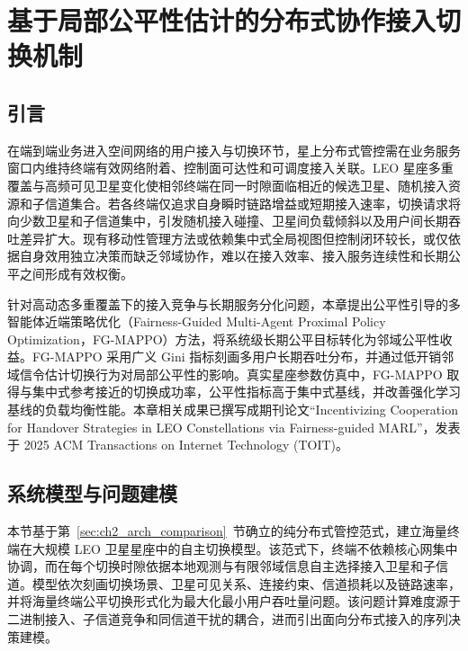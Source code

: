 \chapter{基于局部公平性估计的分布式协作接入切换机制}
\label{chap:handover}

\section{引言}

在端到端业务进入空间网络的用户接入与切换环节，星上分布式管控需在业务服务窗口内维持终端有效网络附着、控制面可达性和可调度接入关联。LEO 星座多重覆盖与高频可见卫星变化使相邻终端在同一时隙面临相近的候选卫星、随机接入资源和子信道集合。若各终端仅追求自身瞬时链路增益或短期接入速率，切换请求将向少数卫星和子信道集中，引发随机接入碰撞、卫星间负载倾斜以及用户间长期吞吐差异扩大。现有移动性管理方法或依赖集中式全局视图但控制闭环较长，或仅依据自身效用独立决策而缺乏邻域协作，难以在接入效率、接入服务连续性和长期公平之间形成有效权衡。

针对高动态多重覆盖下的接入竞争与长期服务分化问题，本章提出公平性引导的多智能体近端策略优化（Fairness-Guided Multi-Agent Proximal Policy Optimization，FG-MAPPO）方法，将系统级长期公平目标转化为邻域公平性收益。FG-MAPPO 采用广义 Gini 指标刻画多用户长期吞吐分布，并通过低开销邻域信令估计切换行为对局部公平性的影响。真实星座参数仿真中，FG-MAPPO 取得与集中式参考接近的切换成功率，公平性指标高于集中式基线，并改善强化学习基线的负载均衡性能。本章相关成果已撰写成期刊论文``Incentivizing Cooperation for Handover Strategies in LEO Constellations via Fairness-guided MARL''\cite{lxp-incentivizing}，发表于 2025 ACM Transactions on Internet Technology (TOIT)。

\section{系统模型与问题建模}
\label{sec:ch3_sysmodel}

本节基于第~\ref{sec:ch2_arch_comparison}~节确立的纯分布式管控范式，建立海量终端在大规模 LEO 卫星星座中的自主切换模型。该范式下，终端不依赖核心网集中协调，而在每个切换时隙依据本地观测与有限邻域信息自主选择接入卫星和子信道。模型依次刻画切换场景、卫星可见关系、连接约束、信道损耗以及链路速率，并将海量终端公平切换形式化为最大化最小用户吞吐量问题。该问题计算难度源于二进制接入、子信道竞争和同信道干扰的耦合，进而引出面向分布式接入的序列决策建模。

